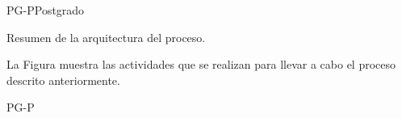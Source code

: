 


\begin{procesoGeneral}{PG-P}{Postgrado} {

		Resumen de la arquitectura del proceso.

		\noindent La Figura  muestra las actividades que se realizan para llevar a cabo el proceso descrito anteriormente.

	}{PG-P}

\end{procesoGeneral}

